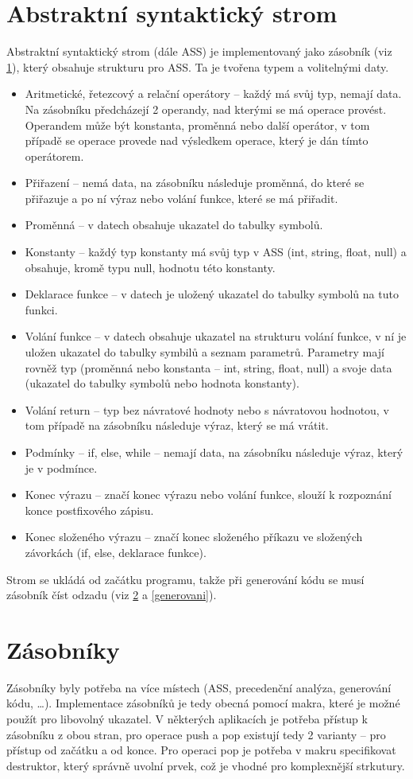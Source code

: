 \documentclass[a4paper, 12pt]{article}
\begin{document}
    \section{Abstraktní syntaktický strom}
    Abstraktní syntaktický strom (dále ASS) je implementovaný jako zásobník (viz \ref{}), který obsahuje strukturu pro ASS. Ta je tvořena typem a volitelnými daty.
    \begin{itemize}
        \item Aritmetické, řetezcový a relační operátory -- každý má svůj typ, nemají data. Na zásobníku předcházejí 2 operandy, nad kterými se má operace provést. Operandem může být konstanta, proměnná nebo další operátor, v tom případě se operace provede nad výsledkem operace, který je dán tímto operátorem.
        \item Přiřazení -- nemá data, na zásobníku následuje proměnná, do které se přiřazuje a po ní výraz nebo volání funkce, které se má přiřadit.
        \item Proměnná -- v datech obsahuje ukazatel do tabulky symbolů.
        \item Konstanty -- každý typ konstanty má svůj typ v ASS (int, string, float, null) a obsahuje, kromě typu null, hodnotu této konstanty.
        \item Deklarace funkce -- v datech je uložený ukazatel do tabulky symbolů na tuto funkci.
        \item Volání funkce -- v datech obsahuje ukazatel na strukturu volání funkce, v ní je uložen ukazatel do tabulky symbilů a seznam parametrů. Parametry mají rovněž typ (proměnná nebo konstanta -- int, string, float, null) a svoje data (ukazatel do tabulky symbolů nebo hodnota konstanty).
        \item Volání return -- typ bez návratové hodnoty nebo s návratovou hodnotou, v tom případě na zásobníku následuje výraz, který se má vrátit.
        \item Podmínky -- if, else, while -- nemají data, na zásobníku následuje výraz, který je v podmínce.
        \item Konec výrazu -- značí konec výrazu nebo volání funkce, slouží k rozpoznání konce postfixového zápisu.
        \item Konec složeného výrazu -- značí konec složeného příkazu ve složených závorkách (if, else, deklarace funkce).
    \end{itemize}
    Strom se ukládá od začátku programu, takže při generování kódu se musí zásobník číst odzadu (viz \ref{zasobniky} a \ref{generovani}).
    \section{Zásobníky} \label{zasobniky}
    Zásobníky byly potřeba na více místech (ASS, precedenční analýza, generování kódu, \ldots). Implementace zásobníků je tedy obecná pomocí makra, které je možné použít pro libovolný ukazatel. V některých aplikacích je potřeba přístup k zásobníku z obou stran, pro operace push a pop existují tedy 2 varianty -- pro přístup od začátku a od konce. Pro operaci pop je potřeba v makru specifikovat destruktor, který správně uvolní prvek, což je vhodné pro komplexnější strkutury.
\end{document}
